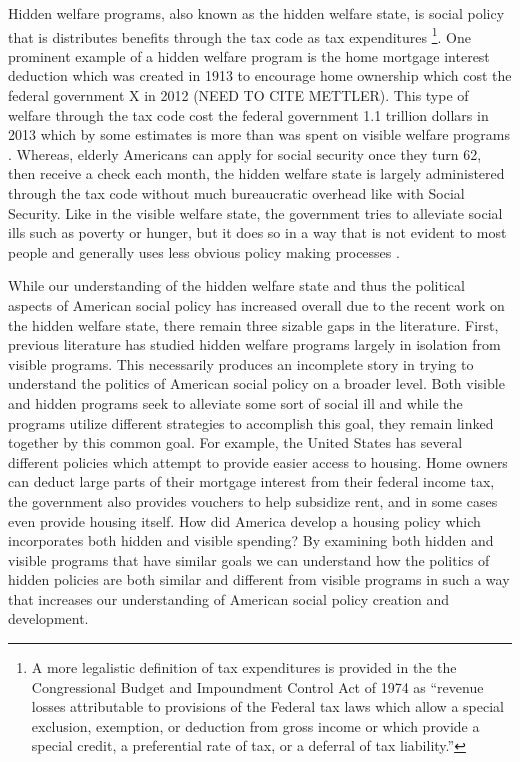 \documentclass[12pt]{article}
\begin{document}
Hidden welfare programs, also known as the hidden welfare state, is social policy that is distributes benefits through the tax code as tax expenditures \citep{howard1997}\footnote{A more legalistic definition of tax expenditures is provided in the the Congressional Budget and Impoundment Control Act of 1974 as ``revenue losses attributable to provisions of the Federal tax laws which allow a special exclusion, exemption, or deduction from gross income or which provide a special credit, a preferential rate of tax, or a deferral of tax liability.''}. One prominent example of a hidden welfare program is the home mortgage interest deduction which was created in 1913 to encourage home ownership which cost the federal government X in 2012 (NEED TO CITE METTLER). This type of welfare through the tax code cost the federal government 1.1 trillion dollars in 2013 which by some estimates is more than was spent on visible welfare programs \citep{omb2013}. Whereas, elderly Americans can apply for social security once they turn 62, then receive a check each month, the hidden welfare state is largely administered through the tax code without much bureaucratic overhead like with Social Security. Like in the visible welfare state, the government tries to alleviate social ills such as poverty or hunger, but it does so in a way that is not evident to most people and generally uses less obvious policy making processes \citep{mettler2011}. 

While our understanding of the hidden welfare state and thus the political aspects of American social policy has increased overall due to the recent work on the hidden welfare state, there remain three sizable gaps in the literature. First, previous literature has studied hidden welfare programs largely in isolation from visible programs. This necessarily produces an incomplete story in trying to understand the politics of American social policy on a broader level. Both visible and hidden programs seek to alleviate some sort of social ill and while the programs utilize different strategies to accomplish this goal, they remain linked together by this common goal. For example, the United States has several different policies which attempt to provide easier access to housing. Home owners can deduct large parts of their mortgage interest from their federal income tax, the government also provides vouchers to help subsidize rent, and in some cases even provide housing itself. How did America develop a housing policy which incorporates both hidden and visible spending? By examining both hidden and visible programs that have similar goals we can understand how the politics of hidden policies are both similar and different from visible programs in such a way that increases our understanding of American social policy creation and development.
\end{document}
